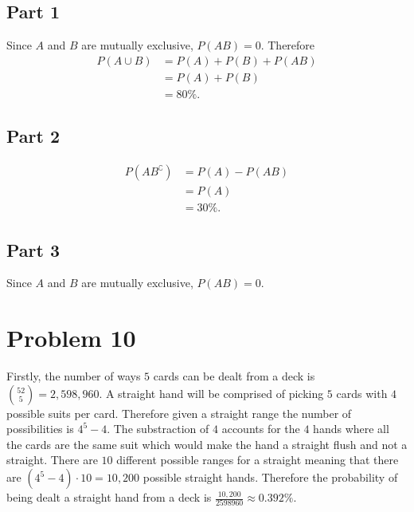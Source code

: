 \documentclass[12pt]{extarticle}
\begin{document}
\subsection*{Part 1}
Since $A$ and $B$ are mutually exclusive, $P(AB) = 0$. Therefore 
\begin{align*}
	P(A \cup B) &= P(A) + P(B) + P(AB) \\ 
							&= P(A) + P(B) \\ 
							&= 80\%
.\end{align*}

\subsection*{Part 2}
\begin{align*}
	P(AB^\complement) &= P(A) - P(AB) \\
										&= P(A) \\
										&= 30\%
.\end{align*}

\subsection*{Part 3}
Since $A$ and $B$ are mutually exclusive, $P(AB) = 0$.

\section*{Problem 10}
Firstly, the number of ways $5$ cards can be dealt from a deck is $\binom{52}{5} = 2,598,960$. A straight hand will be comprised of picking $5$ cards with $4$ possible suits per card. Therefore given a straight range the number of possibilities is $4^5 - 4$. The substraction of $4$ accounts for the $4$ hands where all the cards are the same suit which would make the hand a straight flush and not a straight. There are $10$ different possible ranges for a straight meaning that there are $(4^5 - 4)\cdot 10 = 10,200$ possible straight hands. Therefore the probability of being dealt a straight hand from a deck is $\frac{10,200}{2598960} \approx 0.392\%$.
\end{document}
